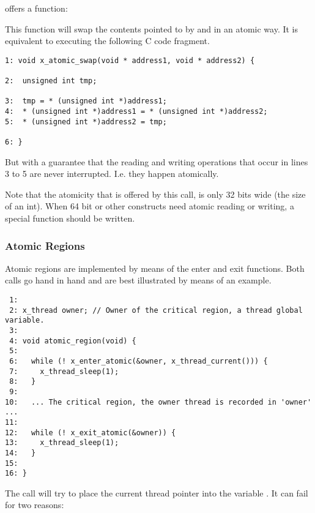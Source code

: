 \oswald offers a function: 


This function will swap the contents pointed to by  and
 in an atomic way. It is equivalent to executing the
following C code fragment.

\bcode
\begin{verbatim}
1: void x_atomic_swap(void * address1, void * address2) {

2:  unsigned int tmp;

3:  tmp = * (unsigned int *)address1;
4:  * (unsigned int *)address1 = * (unsigned int *)address2;
5:  * (unsigned int *)address2 = tmp;

6: }
\end{verbatim}
\ecode

But with a guarantee that the reading and writing operations that occur in
lines 3 to 5 are never interrupted. I.e. they happen atomically.

Note that the atomicity that is offered by this call, is only 32 bits wide
(the size of an int). When 64 bit or other constructs need atomic reading or
writing, a special function should be written.

\subsubsection{Atomic Regions}

Atomic regions are implemented by means of the enter and exit functions.
Both calls go hand in hand and are best illustrated by means of an example.

\bcode
\begin{verbatim}
 1:
 2: x_thread owner; // Owner of the critical region, a thread global variable.
 3:
 4: void atomic_region(void) {
 5:
 6:   while (! x_enter_atomic(&owner, x_thread_current())) {
 7:     x_thread_sleep(1);
 8:   }
 9:
10:   ... The critical region, the owner thread is recorded in 'owner' ...
11:
12:   while (! x_exit_atomic(&owner)) {
13:     x_thread_sleep(1);
14:   }
15:
16: }
\end{verbatim}
\ecode

The  call will try to place the current thread
pointer into the variable . It can fail for two reasons:

